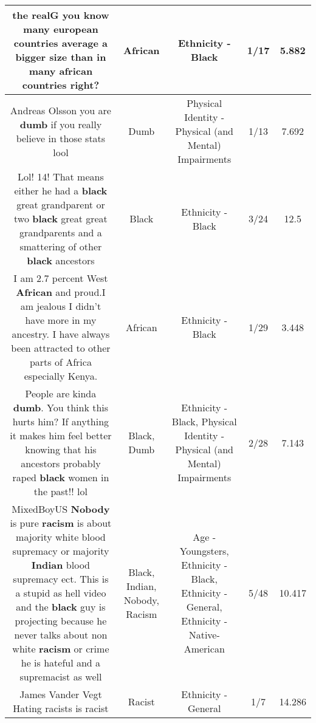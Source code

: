 \documentclass[11pt]{article}
\newlength\mylength
\begin{document}
\begin{center}
\begin{longtable}{|C{.65\mylength}|C{.30\mylength}|C{.12\mylength}|C{.12\mylength}|C{.12\mylength}|}
  \small the realG you know many european countries average a bigger size than in many \textbf{african} countries right?\normalsize   & African & Ethnicity - Black & 1/17 & 5.882 \\  \hline
  \small Andreas Olsson you are \textbf{dumb} if you really believe in those stats lool\normalsize   & Dumb & Physical Identity - Physical (and Mental) Impairments & 1/13 & 7.692 \\  \hline
  \small Lol! 14! That means either he had a \textbf{black} great grandparent or two \textbf{black} great great grandparents and a smattering of other \textbf{black} ancestors\normalsize   & Black & Ethnicity - Black & 3/24 & 12.5 \\  \hline
  \small I am 2.7 percent West \textbf{African} and proud.I am jealous I didn't have more in my ancestry. I have always​ been attracted to other parts of Africa especially Kenya.\normalsize   & African & Ethnicity - Black & 1/29 & 3.448 \\  \hline
  \small People are kinda \textbf{dumb}. You think this hurts him? If anything it makes him feel better knowing that his ancestors probably raped \textbf{black} women in the past!! lol\normalsize   & Black, Dumb & Ethnicity - Black, Physical Identity - Physical (and Mental) Impairments & 2/28 & 7.143 \\  \hline
  \small MixedBoyUS \textbf{Nobody} is pure \textbf{racism} is about majority white blood supremacy or majority \textbf{Indian} blood supremacy ect. This is a stupid as hell video and the \textbf{black} guy is projecting because he never talks about non white \textbf{racism} or crime he is hateful and a supremacist as well\normalsize   & Black, Indian, Nobody, Racism & Age - Youngsters, Ethnicity - Black, Ethnicity - General, Ethnicity - Native-American & 5/48 & 10.417 \\  \hline
  \small James Vander Vegt Hating racists is racist\normalsize   & Racist & Ethnicity - General & 1/7 & 14.286 \\  \hline

\end{longtable}
\end{center}
\end{document}
